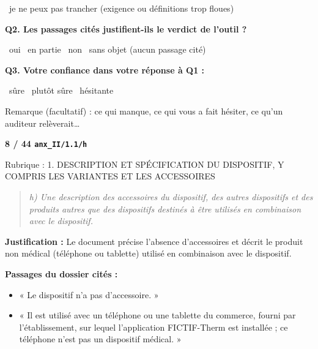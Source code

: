 \documentclass[11pt,a4paper]{article}
\newcommand{\rub}[1]{\par\medskip{\bfseries\color{gris}#1}\par}
\begin{document}
\begin{Form}
\CheckBox[name=u7_indecis,width=1.05em,height=1.05em,bordercolor={0 0 0},borderwidth=1]{}~je ne peux pas trancher (exigence ou définitions trop floues)\par
\textbf{Q2. Les passages cités justifient-ils le verdict de l'outil ?}\par
\CheckBox[name=u7_cit_oui,width=1.05em,height=1.05em,bordercolor={0 0 0},borderwidth=1]{}~oui \quad \CheckBox[name=u7_cit_partiel,width=1.05em,height=1.05em,bordercolor={0 0 0},borderwidth=1]{}~en partie \quad \CheckBox[name=u7_cit_non,width=1.05em,height=1.05em,bordercolor={0 0 0},borderwidth=1]{}~non \quad \CheckBox[name=u7_cit_sans,width=1.05em,height=1.05em,bordercolor={0 0 0},borderwidth=1]{}~sans objet (aucun passage cité)\par
\textbf{Q3. Votre confiance dans votre réponse à Q1 :}\par
\CheckBox[name=u7_conf_sure,width=1.05em,height=1.05em,bordercolor={0 0 0},borderwidth=1]{}~sûre \quad \CheckBox[name=u7_conf_plutot,width=1.05em,height=1.05em,bordercolor={0 0 0},borderwidth=1]{}~plutôt sûre \quad \CheckBox[name=u7_conf_hesitante,width=1.05em,height=1.05em,bordercolor={0 0 0},borderwidth=1]{}~hésitante\par
Remarque (facultatif) : ce qui manque, ce qui vous a fait hésiter, ce qu'un auditeur relèverait\ldots\par
\TextField[name=u7_note,multiline=true,width=\linewidth,height=2.2cm,bordercolor={0.6 0.6 0.6},borderwidth=0.5]{}
\newpage
{\Large\bfseries 8 / 44 \quad \texttt{anx\_II/1.1/h}}\par
{\small\color{gris} Rubrique : 1. DESCRIPTION ET SPÉCIFICATION DU DISPOSITIF, Y COMPRIS LES VARIANTES ET LES ACCESSOIRES}\par
\rub{L'exigence}
\begin{quote}\itshape h) Une description des accessoires du dispositif, des autres dispositifs et des produits autres que des dispositifs destinés à être utilisés en combinaison avec le dispositif.\end{quote}
\rub{La réponse de l'outil : conforme}
\textbf{Justification :} Le document précise l'absence d'accessoires et décrit le produit non médical (téléphone ou tablette) utilisé en combinaison avec le dispositif.\par
\textbf{Passages du dossier cités :}
\begin{itemize}
\item « Le dispositif n'a pas d'accessoire. »
\item « Il est utilisé avec un téléphone ou une tablette du commerce, fourni par l'établissement, sur lequel l'application FICTIF-Therm est installée ; ce téléphone n'est pas un dispositif médical. »

\end{itemize}
\end{Form}
\end{document}

